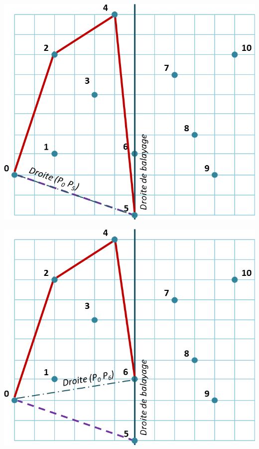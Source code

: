 \documentclass[10pt,fleqn]{article} %
\begin{document}
\begin{minipage}[c]{.22\linewidth}
\begin{center}
\includegraphics[width=.95\textwidth]{images/orientation_3}
\end{center}
\end{minipage} \hfill
\begin{minipage}[c]{.22\linewidth}
\begin{center}
\includegraphics[width=.95\textwidth]{images/orientation_4}
\end{center}
\end{minipage} 
\end{document}
